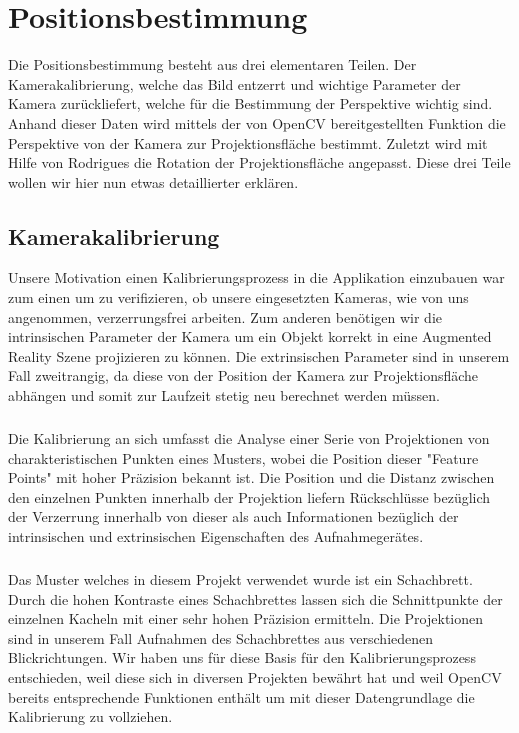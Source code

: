 \chapter{Positionsbestimmung}

Die Positionsbestimmung besteht aus drei elementaren Teilen. Der Kamerakalibrierung, welche das Bild entzerrt und wichtige Parameter der Kamera zurückliefert, welche für die Bestimmung der Perspektive wichtig sind. Anhand dieser Daten wird mittels der von OpenCV bereitgestellten Funktion die Perspektive von der Kamera zur Projektionsfläche bestimmt. Zuletzt wird mit Hilfe von Rodrigues die Rotation der Projektionsfläche angepasst. Diese drei Teile wollen wir hier nun etwas detaillierter erklären.

\section{Kamerakalibrierung}
Unsere Motivation einen Kalibrierungsprozess in die Applikation einzubauen war zum einen um zu verifizieren, ob unsere eingesetzten Kameras, wie von uns angenommen, verzerrungsfrei arbeiten. Zum anderen benötigen wir die intrinsischen Parameter der Kamera um ein Objekt korrekt in eine Augmented Reality Szene projizieren zu können. Die extrinsischen Parameter sind in unserem Fall zweitrangig, da diese von der Position der Kamera zur Projektionsfläche abhängen und somit zur Laufzeit stetig neu berechnet werden müssen.
\paragraph{}
Die Kalibrierung an sich umfasst die Analyse einer Serie von Projektionen von charakteristischen Punkten eines Musters, wobei die Position dieser "Feature Points" mit hoher Präzision bekannt ist. Die Position und die Distanz zwischen den einzelnen Punkten innerhalb der Projektion liefern Rückschlüsse bezüglich der Verzerrung innerhalb von dieser als auch Informationen bezüglich der intrinsischen und extrinsischen Eigenschaften des Aufnahmegerätes. 
\paragraph{}
Das Muster welches in diesem Projekt verwendet wurde ist ein Schachbrett. Durch die hohen Kontraste eines Schachbrettes lassen sich die Schnittpunkte der einzelnen Kacheln mit einer sehr hohen Präzision ermitteln. Die Projektionen sind in unserem Fall Aufnahmen des Schachbrettes aus verschiedenen Blickrichtungen. Wir haben uns für diese Basis für den Kalibrierungsprozess entschieden, weil diese sich in diversen Projekten bewährt hat und weil OpenCV bereits entsprechende Funktionen enthält um mit dieser Datengrundlage die Kalibrierung zu vollziehen. 

